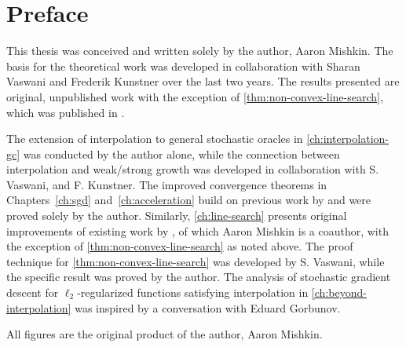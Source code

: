 
\chapter{Preface}

This thesis was conceived and written solely by the author, Aaron Mishkin. 
The basis for the theoretical work was developed in collaboration with Sharan Vaswani and Frederik Kunstner over the last two years.
The results presented are original, unpublished work with the exception of \autoref{thm:non-convex-line-search}, which was published in \citet{vaswani2019painless}.

The extension of interpolation to general stochastic oracles in \autoref{ch:interpolation-gc} was conducted by the author alone, while the connection between interpolation and weak/strong growth was developed in collaboration with S. Vaswani, and F. Kunstner. 
The improved convergence theorems in Chapters~\ref{ch:sgd} and~\ref{ch:acceleration} build on previous work by \citet{vaswani2019fast} and were proved solely by the author.  
Similarly, \autoref{ch:line-search} presents original improvements of existing work by \citet{vaswani2019painless}, of which Aaron Mishkin is a coauthor, with the exception of \autoref{thm:non-convex-line-search} as noted above.
The proof technique for \autoref{thm:non-convex-line-search} was developed by S. Vaswani, while the specific result was proved by the author. 
The analysis of stochastic gradient descent for \( \ell_2 \)-regularized functions satisfying interpolation in \autoref{ch:beyond-interpolation} was inspired by a conversation with Eduard Gorbunov.

All figures are the original product of the author, Aaron Mishkin.

